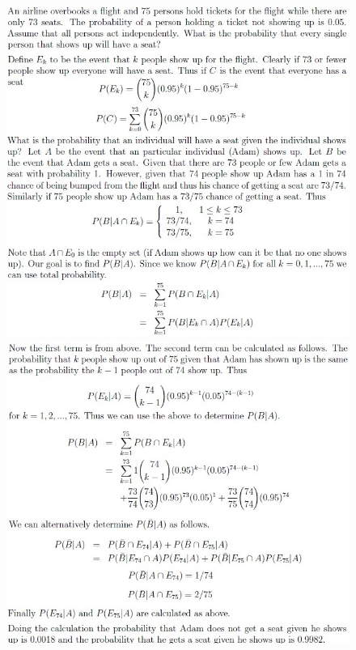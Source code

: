 \documentclass[11pt,landscape]{article}
\begin{document}
\begin{multicols}{3}
\begin{figure}[H]
\end{figure}
\begin{figure}[H]
    \includegraphics[scale=0.46]{./Images/1/Seat1.jpg}
    \includegraphics[scale=0.46]{./Images/1/Seat2.jpg}
\end{figure}
\begin{figure}[H]

\end{figure}
\end{multicols}
\end{document}
